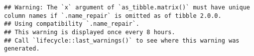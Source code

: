 \documentclass[
]{article}
\begin{document}
\begin{verbatim}
## Warning: The `x` argument of `as_tibble.matrix()` must have unique column names if `.name_repair` is omitted as of tibble 2.0.0.
## Using compatibility `.name_repair`.
## This warning is displayed once every 8 hours.
## Call `lifecycle::last_warnings()` to see where this warning was generated.
\end{verbatim}
\end{document}
